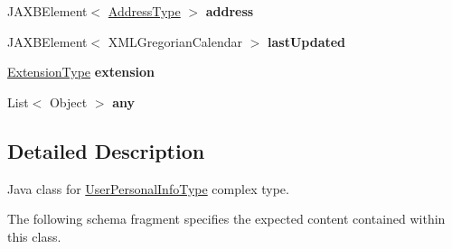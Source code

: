 \begin{DoxyCompactItemize}
\item 
\hypertarget{classcom_1_1telefonica_1_1schemas_1_1unica_1_1rest_1_1directory_1_1v1_1_1UserPersonalInfoType_ab75913c95c5529b9218f0c1f48669e2a}{
JAXBElement$<$ \hyperlink{classcom_1_1telefonica_1_1schemas_1_1unica_1_1rest_1_1common_1_1v1_1_1AddressType}{AddressType} $>$ {\bfseries address}}
\label{classcom_1_1telefonica_1_1schemas_1_1unica_1_1rest_1_1directory_1_1v1_1_1UserPersonalInfoType_ab75913c95c5529b9218f0c1f48669e2a}

\item 
\hypertarget{classcom_1_1telefonica_1_1schemas_1_1unica_1_1rest_1_1directory_1_1v1_1_1UserPersonalInfoType_acc7f8b6a8e487ac13c6f1f6234eb6928}{
JAXBElement$<$ XMLGregorianCalendar $>$ {\bfseries lastUpdated}}
\label{classcom_1_1telefonica_1_1schemas_1_1unica_1_1rest_1_1directory_1_1v1_1_1UserPersonalInfoType_acc7f8b6a8e487ac13c6f1f6234eb6928}

\item 
\hypertarget{classcom_1_1telefonica_1_1schemas_1_1unica_1_1rest_1_1directory_1_1v1_1_1UserPersonalInfoType_af7391b63305c7951aceb0fad804ec4fc}{
\hyperlink{classcom_1_1telefonica_1_1schemas_1_1unica_1_1rest_1_1common_1_1v1_1_1ExtensionType}{ExtensionType} {\bfseries extension}}
\label{classcom_1_1telefonica_1_1schemas_1_1unica_1_1rest_1_1directory_1_1v1_1_1UserPersonalInfoType_af7391b63305c7951aceb0fad804ec4fc}

\item 
\hypertarget{classcom_1_1telefonica_1_1schemas_1_1unica_1_1rest_1_1directory_1_1v1_1_1UserPersonalInfoType_adc6b6cd6f1db5d09d9c241ffcda4f0f1}{
List$<$ Object $>$ {\bfseries any}}
\label{classcom_1_1telefonica_1_1schemas_1_1unica_1_1rest_1_1directory_1_1v1_1_1UserPersonalInfoType_adc6b6cd6f1db5d09d9c241ffcda4f0f1}

\end{DoxyCompactItemize}


\subsection{Detailed Description}
Java class for \hyperlink{classcom_1_1telefonica_1_1schemas_1_1unica_1_1rest_1_1directory_1_1v1_1_1UserPersonalInfoType}{UserPersonalInfoType} complex type.

The following schema fragment specifies the expected content contained within this class.


